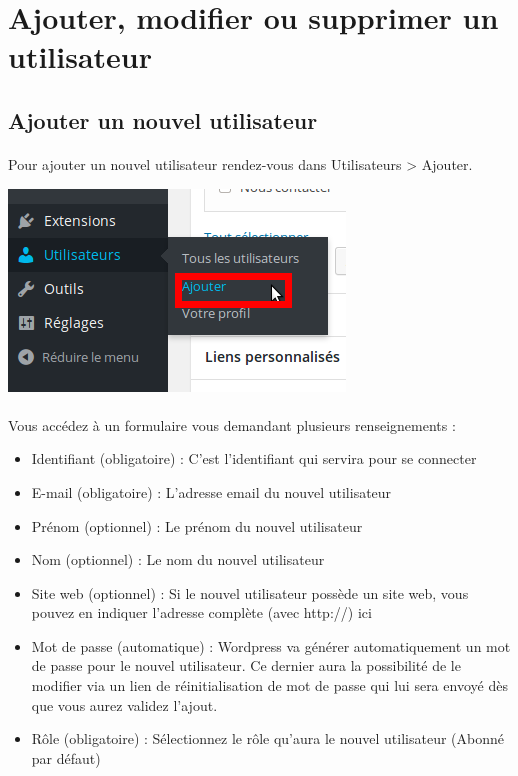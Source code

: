 \documentclass[10pt,a4paper]{article}
\begin{document}
\section{Ajouter, modifier ou supprimer un utilisateur}
\subsection{Ajouter un nouvel utilisateur}
\paragraph{}Pour ajouter un nouvel utilisateur rendez-vous dans Utilisateurs > Ajouter.
\begin{center}
\includegraphics[scale=0.3]{img/0157.png}
\end{center}
\paragraph{}Vous accédez à un formulaire vous demandant plusieurs renseignements :
\begin{itemize}
\item Identifiant (obligatoire) : C'est l'identifiant qui servira pour se connecter
\item E-mail (obligatoire) : L'adresse email du nouvel utilisateur
\item Prénom (optionnel) : Le prénom du nouvel utilisateur
\item Nom (optionnel) : Le nom du nouvel utilisateur
\item Site web (optionnel) : Si le nouvel utilisateur possède un site web, vous pouvez en indiquer l'adresse complète (avec http://) ici
\item Mot de passe (automatique) : Wordpress va générer automatiquement un mot de passe pour le nouvel utilisateur. Ce dernier aura la possibilité de le modifier via un lien de réinitialisation de mot de passe qui lui sera envoyé dès que vous aurez validez l'ajout.
\item Rôle (obligatoire) : Sélectionnez le rôle qu'aura le nouvel utilisateur (Abonné par défaut)
\end{itemize}
\end{document}
